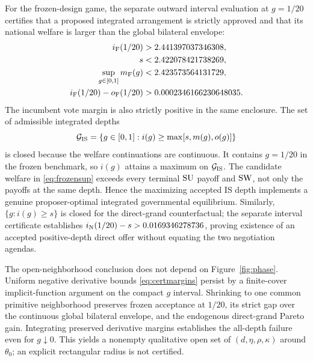 For the frozen-design game, the separate outward interval evaluation at $g=1/20$ certifies that a proposed integrated arrangement is strictly approved and that its national welfare is larger than the global bilateral envelope:
\begin{equation}\label{eq:frozensup}
\begin{split}
i_{\mathrm{F}}(1/20)&>2.441397037346308,\\
s&<2.422078421738269,\\
\sup_{g\in[0,1]}m_{\mathrm{F}}(g)&<2.423573564131729,\\
i_{\mathrm{F}}(1/20)-o_{\mathrm{F}}(1/20)&>0.0002346166230648035.
\end{split}
\end{equation}
The incumbent vote margin is also strictly positive in the same enclosure. The set of admissible integrated depths
\begin{equation}\label{eq:closedfeasible}
\mathcal G_{\mathrm{IS}}=\{g\in[0,1]:i(g)\ge\max[s,m(g),o(g)]\}
\end{equation}
is closed because the welfare continuations are continuous. It contains $g=1/20$ in the frozen benchmark, so $i(g)$ attains a maximum on $\mathcal G_{\mathrm{IS}}$. The candidate welfare in \eqref{eq:frozensup} exceeds every terminal $\mathrm{SU}$ payoff and $\mathrm{SW}$, not only the payoffs at the same depth. Hence the maximizing accepted IS depth implements a genuine proposer-optimal integrated governmental equilibrium. Similarly, $\{g:i(g)\ge s\}$ is closed for the direct-grand counterfactual; the separate interval certificate establishes $i_{\mathrm{N}}(1/20)-s>0.0169346278736$, proving existence of an accepted positive-depth direct offer without equating the two negotiation agendas.

The open-neighborhood conclusion does not depend on Figure~\ref{fig:phase}. Uniform negative derivative bounds \eqref{eq:certmargins} persist by a finite-cover implicit-function argument on the compact $g$ interval. Shrinking to one common primitive neighborhood preserves frozen acceptance at $1/20$, its strict gap over the continuous global bilateral envelope, and the endogenous direct-grand Pareto gain. Integrating preserved derivative margins establishes the all-depth failure even for $g\downarrow0$. This yields a nonempty qualitative open set of $(d,\eta,\rho,\kappa)$ around $\theta_0$; an explicit rectangular radius is not certified.

